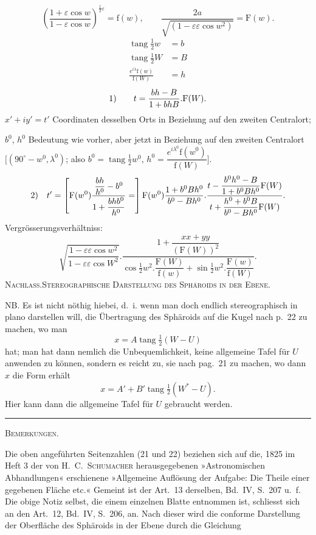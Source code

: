 \[
\left(\frac{1+\varepsilon\cos w}{1-\varepsilon\cos w}\right)^{\frac12\varepsilon}=\mathrm f(w),\qquad
\frac{2a}{\sqrt{(1-\varepsilon\varepsilon\cos w^2)}}=\mathrm F(w).
\]
\[
\begin{aligned}
\operatorname{tang}\tfrac12w&=b\\
\operatorname{tang}\tfrac12W&=B\\
\frac{e^{i\lambda}\mathrm f(w)}{\mathrm f(W)}&=h
\end{aligned}
\]
\[
\begin{array}{r@{\qquad}l}
1)&\displaystyle t=\frac{bh-B}{1+bhB}.\mathrm F(W).
\end{array}
\]
$x'+iy'=t'$ Coordinaten desselben Orts in Beziehung auf den zweiten Centralort;

$b^0$, $h^0$ Bedeutung wie vorher, aber jetzt in Beziehung auf den zweiten Centralort $[(90^\circ-w^0,\lambda^0)$; also $b^0=\operatorname{tang}\tfrac12w^0$, $h^0=\dfrac{e^{i\lambda^0}\mathrm f(w^0)}{\mathrm f(W)}]$.
\[
\begin{array}{r@{\quad}l}
2)&\displaystyle t'=\left[\mathrm F(w^0)\frac{\dfrac{bh}{h^0}-b^0}{1+\dfrac{bhb^0}{h^0}}=\right]
\mathrm F(w^0)\frac{1+b^0Bh^0}{b^0-Bh^0}.
\frac{t-\dfrac{b^0h^0-B}{1+b^0Bh^0}\mathrm F(W)}{t+\dfrac{h^0+b^0B}{b^0-Bh^0}\mathrm F(W)}.
\end{array}
\]
Vergrösserungsverhältniss:
\[
\sqrt{\frac{1-\varepsilon\varepsilon\cos w^2}{1-\varepsilon\varepsilon\cos W^2}}.
\frac{1+\dfrac{xx+yy}{(\mathrm F(W))^2}}{\cos\tfrac12w^2.\dfrac{\mathrm F(W)}{\mathrm f(w)}+\sin\tfrac12w^2.\dfrac{\mathrm F(w)}{\mathrm f(W)}}.
\]
\clearpage
{}\hfill{\footnotesize\textsc{Nachlass.\quad Stereographische Darstellung des Sphäroids in der Ebene.}}\par\medskip
NB. Es ist nicht nöthig hiebei, d.~i. wenn man doch endlich stereographisch in plano darstellen will, die Übertragung des Sphäroids auf die Kugel nach p.~22 zu machen, wo man
\[
x=A\operatorname{tang}\tfrac12(W-U)
\]
hat; man hat dann nemlich die Unbequemlichkeit, keine allgemeine Tafel für $U$ anwenden zu können, sondern es reicht zu, sie nach pag.~21 zu machen, wo dann $x$ die Form erhält
\[
x=A'+B'\operatorname{tang}\tfrac12(W^*-U).
\]
Hier kann dann die allgemeine Tafel für $U$ gebraucht werden.
\begin{center}\rule{.18\textwidth}{.4pt}\par\bigskip\textsc{Bemerkungen.}\end{center}
\begingroup\small
Die oben angeführten Seitenzahlen (21 und 22) beziehen sich auf die, 1825 im Heft 3 der von H.~C.~\textsc{Schumacher} herausgegebenen »Astronomischen Abhandlungen« erschienene »Allgemeine Auflösung der Aufgabe: Die Theile einer gegebenen Fläche etc.« Gemeint ist der Art.~13 derselben, Bd.~IV, S.~207 u.~f. Die obige Notiz selbst, die einem einzelnen Blatte entnommen ist, schliesst sich an den Art.~12, Bd.~IV, S.~206, an. Nach dieser wird die conforme Darstellung der Oberfläche des Sphäroids in der Ebene durch die Gleichung
